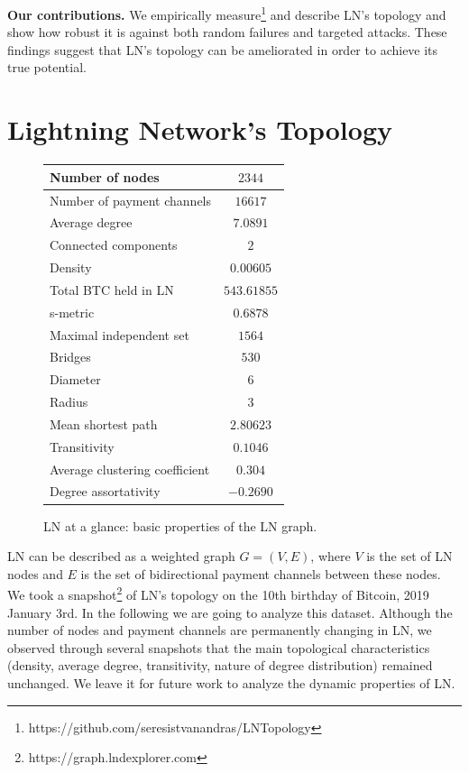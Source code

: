 \documentclass[a4paper]{article}
\theoremstyle{definition}
\def\bitcoinA{%
	\leavevmode
	\vtop{\offinterlineskip %
		\setbox0=\hbox{B}%
		\setbox2=\hbox to\wd0{\hfil\hskip-.03em
			\vrule height .3ex width .15ex\hskip .08em
			\vrule height .3ex width .15ex\hfil}
		\vbox{\copy2\box0}\box2}}
\begin{document}
\textbf{Our contributions.} We empirically measure\footnote{https://github.com/seresistvanandras/LNTopology} and describe LN's topology and show how robust it is against both random failures and targeted attacks. These findings suggest that LN's topology can be ameliorated in order to achieve its true potential.
\section{Lightning Network's Topology}
\begin{figure}
	\begin{tabular}{ | l | c | }
		\hline
		Number of nodes & $2344$  \\ \hline
		Number of payment channels & $16617$  \\ \hline
		Average degree & $7.0891$ \\ \hline
		Connected components & $2$  \\ \hline
		Density & $0.00605$ \\ \hline
		Total BTC held in LN & $543.61855$\bitcoinA\\ \hline
		s-metric& $0.6878$ \\ \hline
		Maximal independent set & $1564$ \\ \hline
		Bridges & $530$ \\ \hline
		Diameter & $6$ \\ \hline
		Radius & $3$ \\ \hline
		Mean shortest path &  $2.80623$ \\ \hline
		Transitivity& $0.1046$\\ \hline
		Average clustering coefficient&$0.304$ \\ \hline
		Degree assortativity& $-0.2690$ \\ \hline
	\end{tabular}
	\caption{LN at a glance: basic properties of the LN graph.}\label{fig:properties}
\end{figure}

LN can be described as a weighted graph $G=(V,E)$, where $V$ is the set of LN nodes and $E$ is the set of bidirectional payment channels between these nodes. We took a snapshot\footnote{https://graph.lndexplorer.com} of LN's topology on the 10th birthday of Bitcoin, 2019 January 3rd. In the following we are going to analyze this dataset. Although the number of nodes and payment channels are permanently changing in LN, we observed through several snapshots that the main topological characteristics (density, average degree, transitivity, nature of degree distribution) remained unchanged. We leave it for future work to analyze the dynamic properties of LN.
\end{document}
